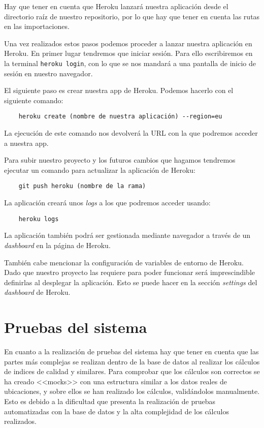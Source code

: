 Hay que tener en cuenta que Heroku lanzará nuestra aplicación desde el directorio raíz de nuestro repositorio, por lo que hay que tener en cuenta las rutas en las importaciones.

Una vez realizados estos pasos podemos proceder a lanzar nuestra aplicación en Heroku. En primer lugar tendremos que iniciar sesión. Para ello escribiremos en la terminal \texttt{heroku login}, con lo que se nos mandará a una pantalla de inicio de sesión en nuestro navegador.

El siguiente paso es crear nuestra app de Heroku. Podemos hacerlo con el siguiente comando:

\begin{verbatim}
	heroku create (nombre de nuestra aplicación) --region=eu
\end{verbatim}

La ejecución de este comando nos devolverá la URL con la que podremos acceder a nuestra app.

Para subir nuestro proyecto y los futuros cambios que hagamos tendremos ejecutar un comando para actualizar la aplicación de Heroku:

\begin{verbatim}
	git push heroku (nombre de la rama)
\end{verbatim}

La aplicación creará unos \textit{logs} a los que podremos acceder usando:
\begin{verbatim}
	heroku logs
\end{verbatim}

La aplicación también podrá ser gestionada mediante navegador a través de un \textit{dashboard} en la página de Heroku.



También cabe mencionar la configuración de variables de entorno de Heroku. Dado que nuestro proyecto las requiere para poder funcionar será imprescindible definirlas al desplegar la aplicación. Esto se puede hacer en la sección \textit{settings} del \textit{dashboard} de Heroku.


\section{Pruebas del sistema}

En cuanto a la realización de pruebas del sistema hay que tener en cuenta que las partes más complejas se realizan dentro de la base de datos al realizar los cálculos de indices de calidad y similares. Para comprobar que los cálculos son correctos se ha creado <<mocks>> con una estructura similar a los datos reales de ubicaciones, y sobre ellos se han realizado los cálculos, validándolos manualmente. Esto es debido a la dificultad que presenta la realización de pruebas automatizadas con la base de datos y la alta complejidad de los cálculos realizados.
